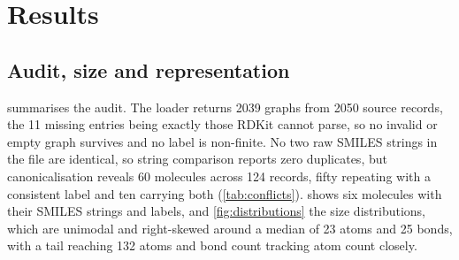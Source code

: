 \section{Results}
\label{sec:results}

\subsection{Audit, size and representation}

 summarises the audit. The loader returns 2039 graphs from 2050 source records, the 11 missing entries being exactly those RDKit cannot parse, so no invalid or empty graph survives and no label is non-finite. No two raw SMILES strings in the file are identical, so string comparison reports zero duplicates, but canonicalisation reveals 60 molecules across 124 records, fifty repeating with a consistent label and ten carrying both (\cref{tab:conflicts}).  shows six molecules with their SMILES strings and labels, and \cref{fig:distributions} the size distributions, which are unimodal and right-skewed around a median of 23 atoms and 25 bonds, with a tail reaching 132 atoms and bond count tracking atom count closely.

